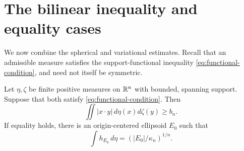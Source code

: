 \section{The bilinear inequality and equality cases}
\label{sec:conclusion}

We now combine the spherical and variational estimates. Recall that an
admissible measure satisfies the support-functional inequality
\eqref{eq:functional-condition}, and need not itself be symmetric.

\begin{theorem}\label{thm:bilinear}
Let $\eta,\zeta$ be finite positive measures on $\mathbb R^n$ with bounded,
spanning support. Suppose that both satisfy
\eqref{eq:functional-condition}. Then
\begin{equation}\label{eq:bilinear}
 \iint |x\cdot y|\,d\eta(x)d\zeta(y)\ge b_n.
\end{equation}
If equality holds, there is an origin-centered ellipsoid $E_0$ such that
\[
 \int h_{E_0}\,d\eta=(|E_0|/\kappa_n)^{1/n}.
\]
\end{theorem}

